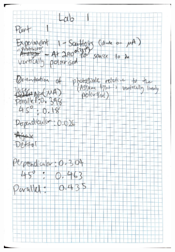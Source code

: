 \documentclass{article}
\begin{document}
\begin{figure}[H]
    \centering
    \includegraphics[width=0.8\textwidth]{labbook1.jpg}
\end{figure}
\end{document}
